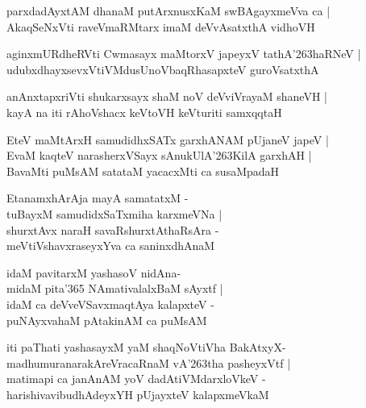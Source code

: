 \documentclass[twoside,12pt,openright]{book}
\def\S{\char'263}
\newcounter{shloka}[chapter]
\begin{document}
\begin{shloka}%
parxdadAyxtAM dhanaM putArxnusxKaM swBAgayxmeVva ca |\\
AkaqSeNxVti raveVmaRMtarx imaM deVvAsatxthA vidhoVH 
\end{shloka}

\begin{shloka}%
aginxmURdheRVti Cwmasayx maMtorxV japeyxV tathA\S haRNeV |\\
udubxdhayxsevxVtiVMdusUnoVbaqRhasapxteV guroVsatxthA 
\end{shloka}

\begin{shloka}%
anAnxtapxriVti shukarxsayx shaM noV deVviVrayaM shaneVH |\\
kayA na iti rAhoVshacx keVtoVH keVturiti samxqqtaH 
\end{shloka}

\begin{shloka}%
EteV maMtArxH samudidhxSATx garxhANAM pUjaneV japeV |\\
EvaM kaqteV narasherxVSayx sAnukUlA\S KilA garxhAH |\\
BavaMti puMsAM satataM yacacxMti ca susaMpadaH 
\end{shloka}

\begin{shloka}%
EtanamxhArAja mayA samatatxM -\\
tuBayxM samudidxSaTxmiha karxmeVNa |\\
shurxtAvx naraH savaRshurxtAthaRsAra -\\
meVtiVshavxraseyxYva ca saninxdhAnaM 
\end{shloka}

\begin{shloka}%
idaM pavitarxM yashasoV nidAna-\\
midaM pita\char'365 NAmativalalxBaM sAyxtf |\\
idaM ca deVveVSavxmaqtAya kalapxteV -\\
puNAyxvahaM pAtakinAM ca puMsAM 
\end{shloka}

\begin{shloka}%
iti paThati yashasayxM yaM shaqNoVtiVha BakAtxyX-\\
madhumuranarakAreVracaRnaM vA\S tha pasheyxVtf |\\
matimapi ca janAnAM yoV dadAtiVMdarxloVkeV -\\
harishivavibudhAdeyxYH pUjayxteV kalapxmeVkaM 
\end{shloka}
\end{document}
